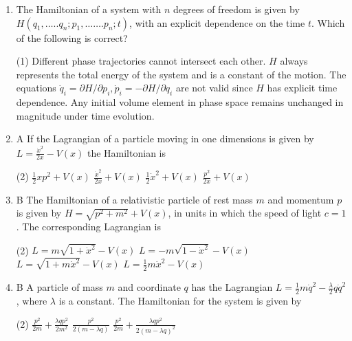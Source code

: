 \begin{enumerate}
	\item  The Hamiltonian of a system with $n$ degrees of freedom is given by $H\left(q_{1}, \ldots . . q_{n} ; p_{1}, \ldots \ldots . p_{n} ; t\right)$, with an explicit dependence on the time $t$. Which of the following is correct?
	{}
	 \begin{tasks}(1)
		\task[\textbf{a.}]Different phase trajectories cannot intersect each other.
		\task[\textbf{b.}]$H$ always represents the total energy of the system and is a constant of the motion.
		\task[\textbf{c.}]The equations $\dot{q}_{i}=\partial H / \partial p_{i}, \dot{p}_{i}=-\partial H / \partial q_{i}$ are not valid since $H$ has explicit time dependence.
		\task[\textbf{d.}]  Any initial volume element in phase space remains unchanged in magnitude under time evolution.
	\end{tasks}
	\item A If the Lagrangian of a particle moving in one dimensions is given by $L=\frac{\dot{x}^{2}}{2 x}-V(x)$ the Hamiltonian is
	{}
	 \begin{tasks}(2)
		\task[\textbf{a.}]$\frac{1}{2} x p^{2}+V(x)$
		\task[\textbf{b.}]$\frac{\dot{x}^{2}}{2 x}+V(x)$
		\task[\textbf{c.}] $\frac{1}{2} \dot{x}^{2}+V(x)$
		\task[\textbf{d.}] $\frac{p^{2}}{2 x}+V(x)$
	\end{tasks}
	\item B The Hamiltonian of a relativistic particle of rest mass $m$ and momentum $p$ is given by $H=\sqrt{p^{2}+m^{2}}+V(x)$, in units in which the speed of light $c=1$. The corresponding Lagrangian is
	{}
	 \begin{tasks}(2)
		\task[\textbf{a.}]$L=m \sqrt{1+\dot{x}^{2}}-V(x)$
		\task[\textbf{b.}]$L=-m \sqrt{1-\dot{x}^{2}}-V(x)$
		\task[\textbf{c.}]$L=\sqrt{1+m \dot{x}^{2}}-V(x)$
		\task[\textbf{d.}] $L=\frac{1}{2} m \dot{x}^{2}-V(x)$
	\end{tasks}
	\item B A particle of mass $m$ and coordinate $q$ has the Lagrangian $L=\frac{1}{2} m \dot{q}^{2}-\frac{\lambda}{2} q \dot{q}^{2}$, where $\lambda$ is a constant. The Hamiltonian for the system is given by
	{}
	 \begin{tasks}(2)
		\task[\textbf{a.}]$\frac{p^{2}}{2 m}+\frac{\lambda q p^{2}}{2 m^{2}}$
		\task[\textbf{b.}]$\frac{p^{2}}{2(m-\lambda q)}$
		\task[\textbf{c.}] $\frac{p^{2}}{2 m}+\frac{\lambda q p^{2}}{2(m-\lambda q)^{2}}$

\end{tasks}
\end{enumerate}
